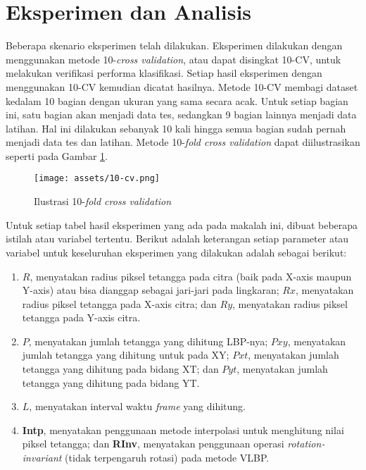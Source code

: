 \documentclass[review,3p,12pt,times]{elsarticle}
\begin{document}
\section{Eksperimen dan Analisis}
\label{experiment}

Beberapa skenario eksperimen telah dilakukan. Eksperimen dilakukan dengan menggunakan metode 10-\textit{cross validation}, atau dapat disingkat 10-CV, untuk melakukan verifikasi performa klasifikasi. Setiap hasil eksperimen dengan menggunakan 10-CV kemudian dicatat hasilnya. Metode 10-CV membagi dataset kedalam 10 bagian dengan ukuran yang sama secara acak. Untuk setiap bagian ini, satu bagian akan menjadi data tes, sedangkan 9 bagian lainnya menjadi data latihan. Hal ini dilakukan sebanyak 10 kali hingga semua bagian sudah pernah menjadi data tes dan latihan. Metode 10-\textit{fold cross validation} dapat diilustrasikan seperti pada Gambar \ref{fig:cv}.

\begin{figure}[hbt!]
\caption{Ilustrasi 10-\textit{fold cross validation}}
\label{fig:cv}
\centering
\texttt{[image: assets/10-cv.png]}

\end{figure}

Untuk setiap tabel hasil eksperimen yang ada pada makalah ini, dibuat beberapa istilah atau variabel tertentu. Berikut adalah keterangan setiap parameter atau variabel untuk keseluruhan eksperimen yang dilakukan adalah sebagai berikut:
\begin{enumerate}
\item $R$, menyatakan radius piksel tetangga pada citra (baik pada X-axis maupun Y-axis) atau bisa dianggap sebagai jari-jari pada lingkaran; $Rx$, menyatakan radius piksel tetangga pada X-axis citra; dan $Ry$, menyatakan radius piksel tetangga pada Y-axis citra.
\item $P$, menyatakan jumlah tetangga yang dihitung LBP-nya; $Pxy$, menyatakan jumlah tetangga yang dihitung untuk pada XY; $Pxt$, menyatakan jumlah tetangga yang dihitung pada bidang XT; dan $Pyt$, menyatakan jumlah tetangga yang dihitung pada bidang YT.
\item $L$, menyatakan interval waktu \textit{frame} yang dihitung.
\item \textbf{Intp}, menyatakan penggunaan metode interpolasi untuk menghitung nilai piksel tetangga; dan \textbf{RInv}, menyatakan penggunaan operasi \textit{rotation-invariant} (tidak terpengaruh rotasi) pada metode VLBP.
\end{enumerate}
\end{document}
